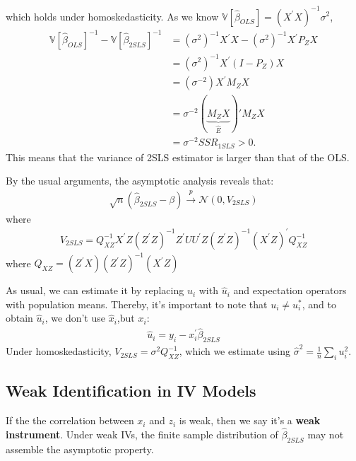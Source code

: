 which holds under homoskedasticity.
As we know $\mathbb{V}[\hat{\beta}_{OLS}] = (X^{\prime} X)^{-1} \sigma^2$, 
\begin{align*}
    \mathbb{V}\left[\hat{\beta}_{OLS}\right]^{-1} - \mathbb{V}\left[\hat{\beta}_{2SLS} \right]^{-1} &= (\sigma^2)^{-1} X^{\prime} X - (\sigma^2)^{-1} X^{\prime} P_Z X \\
    &= (\sigma^2)^{-1} X^{\prime} (I - P_Z) X \\
    &= (\sigma^{-2}) X^{\prime} M_Z X \\
    &= \sigma^{-2} (\underset{\hat{E}}{\underbrace{M_Z X}})' M_Z X \\
    &= \sigma^{-2} SSR_{1SLS} > 0.
\end{align*}
This means that the variance of 2SLS estimator is larger than that of the OLS.

By the usual arguments, the asymptotic analysis reveals that:
\begin{gather*}
    \sqrt{n} (\hat{\beta}_{2SLS} - \beta) \overset{p}{\rightarrow} \mathcal{N} (0, V_{2SLS})
\end{gather*}
where
\begin{gather*}
    V_{2SLS}  = Q_{XZ}^{-1} X^{\prime} Z \left(Z^{\prime} Z\right)^{-1} Z^{\prime} U U^{\prime} Z \left(Z^{\prime} Z \right)^{-1} \left(X^{\prime} Z\right)^{\prime} Q_{XZ}^{-1}
\end{gather*}
where $Q_{XZ} = \left(Z^{\prime} X\right) \left(Z^{\prime} Z\right)^{-1}  \left(X^{\prime} Z\right)$

As usual, we can estimate it by replacing $u_i$ with $\hat{u}_i$ and expectation operators with population means.
Thereby, it's important to note that $u_i \neq u_i^*$, and to obtain $\hat{u}_i$, we don't use $\hat{x}_i$,but $x_i$:
\begin{gather*}
     \hat{u}_i = y_i - x_i^{\prime} \hat{\beta}_{2SLS}
\end{gather*}
Under homoskedasticity, $V_{2SLS} = \sigma^2 Q_{XZ}^{-1} $, which we estimate using $\hat{\sigma}^2 = \frac{1}{n} \sum_i u_i^2$.


\subsection{Weak Identification in IV Models}

If the the correlation between $x_i$ and $z_i$ is weak, then we say it's a \textbf{weak instrument}.
Under weak IVs, the finite sample distribution of $\hat{\beta}_{2SLS}$ may not assemble the asymptotic property.

